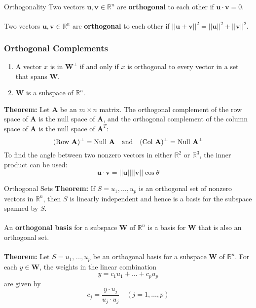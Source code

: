 \begin{defbox}{Orthogonality}
    Two vectors $\mathbf{u}, \mathbf{v} \in \mathbb{R}^n$ are \textbf{orthogonal} to each other if $\mathbf{u \cdot v} = 0$.\\\\
    Two vectors $\mathbf{u}, \mathbf{v} \in \mathbb{R}^n$ are \textbf{orthogonal} to each other if $||\mathbf{u} + \mathbf{v}||^2 = ||\mathbf{u}||^2 + ||\mathbf{v}||^2$.
    \subsubsection*{Orthogonal Complements}
    \begin{enumerate}
        \item A vector $x$ is in $\mathbf{W}^\perp$ if and only if $x$ is orthogonal to every vector in a set that spans $\mathbf{W}$.
        \item $\mathbf{W}$ is a subspace of $\mathbb{R}^n$.
    \end{enumerate}
    \textbf{Theorem:} Let $\mathbf{A}$ be an $m \times n$ matrix. The orthogonal complement of the row space of $\mathbf{A}$ is the null space of $\mathbf{A}$, and the orthogonal complement of the column space of $\mathbf{A}$ is the null space of $\mathbf{A}^T$:
    \[
        (\text{Row }\mathbf{A})^\perp = \text{Null }\mathbf{A} \text{\quad and\quad} (\text{Col }\mathbf{A})^\perp = \text{Null }\mathbf{A}^\perp
    \]
    To find the angle between two nonzero vectors in either $\mathbb{R}^2$ or $\mathbb{R}^3$, the inner product can be used:
    \[
        \mathbf{u \cdot v} = ||\mathbf{u}|| ||\mathbf{v}|| \cos{\theta}
    \]
\end{defbox}
\pagebreak
\begin{defbox}{Orthogonal Sets}
    \textbf{Theorem: } If $S = {u_1, \dots, u_p}$ is an orthogonal set of nonzero vectors in $\mathbb{R}^n$, then $S$ is linearly independent and hence is a basis for the subspace spanned by $S$.\\\\
    An \textbf{orthogonal basis} for a subspace $\mathbf{W}$ of $\mathbb{R}^n$ is a basis for $\mathbf{W}$ that is also an orthogonal set.\\\\
    \textbf{Theorem: } Let $S = {u_1, \dots, u_p}$ be an orthogonal basis for a subspace $\mathbf{W}$ of $\mathbb{R}^n$. For each $y \in \mathbf{W}$, the weights in the linear combination
    \[
        y = c_1u_1 + \dots + c_pu_p
    \]
    are given by
    \[
        c_j = \frac{y \cdot u_j}{u_j \cdot u_j}\quad(j = 1,\dots,p)
    \]
\end{defbox}

